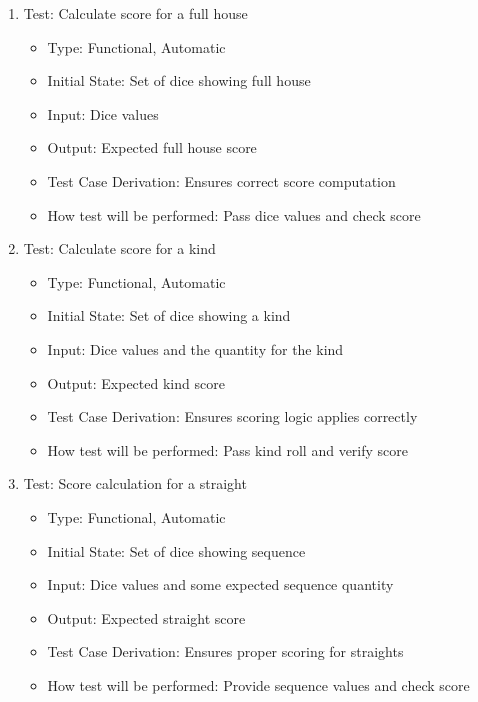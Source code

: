 \documentclass[12pt, titlepage]{article}
\begin{document}
\begin{enumerate}
    \item Test: Calculate score for a full house
    \begin{itemize}
        \item Type: Functional, Automatic
        \item Initial State: Set of dice showing full house
        \item Input: Dice values
        \item Output: Expected full house score
        \item Test Case Derivation: Ensures correct score computation
        \item How test will be performed: Pass dice values and check score
    \end{itemize}

    \item Test: Calculate score for a kind
    \begin{itemize}
        \item Type: Functional, Automatic
        \item Initial State: Set of dice showing a kind
        \item Input: Dice values and the quantity for the kind
        \item Output: Expected kind score
        \item Test Case Derivation: Ensures scoring logic applies correctly
        \item How test will be performed: Pass kind roll and verify score
    \end{itemize}

    \item Test: Score calculation for a straight
    \begin{itemize}
        \item Type: Functional, Automatic
        \item Initial State: Set of dice showing sequence
        \item Input: Dice values and some expected sequence quantity
        \item Output: Expected straight score
        \item Test Case Derivation: Ensures proper scoring for straights
        \item How test will be performed: Provide sequence values and check score
    \end{itemize}


\end{enumerate}
\end{document}
